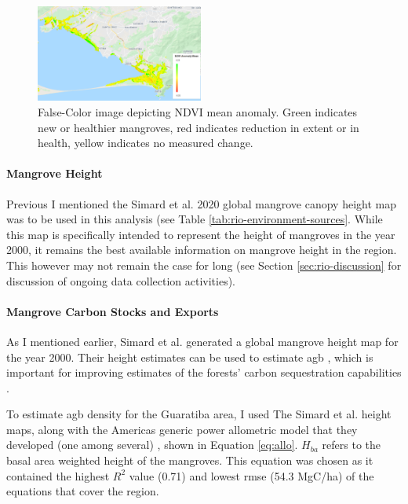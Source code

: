 \begin{figure}[H] 
\centering
\includegraphics[width=0.49\textwidth]{Figures/chap4/guaratiba_anomaly.png}
\caption[False-Color image depicting NDVI mean anomaly]{False-Color image depicting NDVI mean anomaly. Green indicates new or healthier mangroves, red indicates reduction in extent or in health, yellow indicates no measured change.}
\label{fig:anomaly}
\end{figure}

\paragraph{Mangrove Height} \label{sec:rio-mangrove-height} \leavevmode\newline

Previous I mentioned the Simard et al. 2020 global mangrove canopy height map was to be used in this analysis (see Table \ref{tab:rio-environment-sources}. While this map is specifically intended to represent the height of mangroves in the year 2000, it remains the best available information on mangrove height in the region. This however may not remain the case for long (see Section \ref{sec:rio-discussion} for discussion of ongoing data collection activities).

\paragraph{Mangrove Carbon Stocks and Exports} \label{sec:rio-mangrove-carbon} \leavevmode\newline

As I mentioned earlier, Simard et al. generated a global mangrove height map for the year 2000. Their height estimates can be used to estimate \ac{agb} \cite{cloughAllometricRelationshipsEstimating1989, fatoyinboEstimatingMangroveAboveground2018}, which is important for improving estimates of the forests' carbon sequestration capabilities \cite{lagomasinoMeasuringMangroveCarbon2019, simardMangroveCanopyHeight2019}.

To estimate \ac{agb} density for the Guaratiba area, I used The Simard et al. height maps, along with the Americas generic power allometric model that they developed (one among several) \cite{simardMangroveCanopyHeight2019}, shown in Equation \ref{eq:allo}. $H_{ba}$ refers to the basal area weighted height of the mangroves. This equation was chosen as it contained the highest $R^2$ value (0.71) and lowest \ac{rmse} (54.3 MgC/ha) of the equations that cover the region. 

